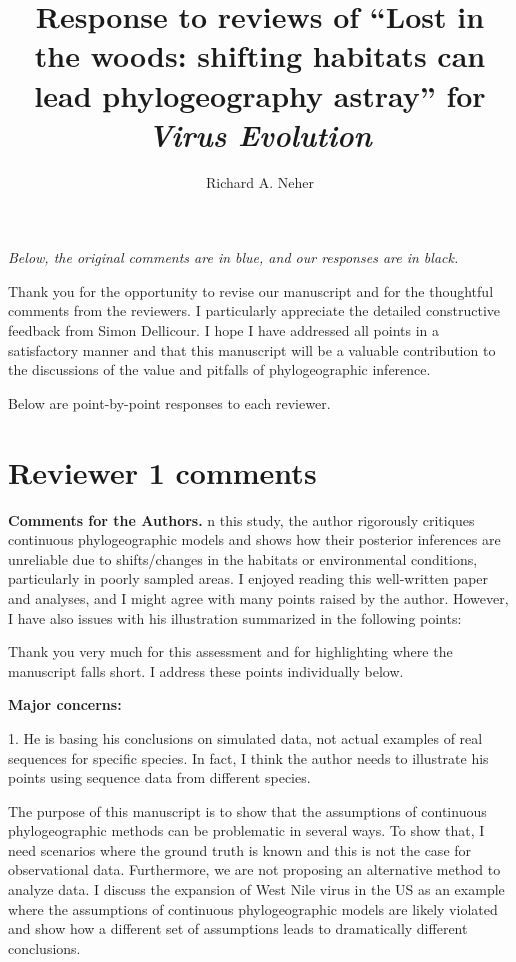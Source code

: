\documentclass[11pt, oneside]{article}   	%
\title{Response to reviews of ``Lost in the woods: shifting habitats can lead phylogeography astray'' for \textit{Virus Evolution}}
\author{
Richard A. Neher
}
\newcommand{\response}[1]{{\color{black}{\bf Response:} #1}}
\begin{document}
\maketitle

\emph{Below, the original comments {\color{blue} are in blue}, and our responses are in black.}

\color{blue}

\response{
Thank you for the opportunity to revise our manuscript and for the thoughtful comments from the reviewers.
I particularly appreciate the detailed constructive feedback from Simon Dellicour.
I hope I have addressed all points in a satisfactory manner and that this manuscript will be a valuable contribution to the discussions of the value and pitfalls of phylogeographic inference.

Below are point-by-point responses to each reviewer.
}

\section*{Reviewer 1 comments}

{\bf Comments for the Authors.}
n this study, the author rigorously critiques continuous phylogeographic models and shows how their posterior inferences are unreliable due to shifts/changes in the habitats or environmental conditions, particularly in poorly sampled areas. I enjoyed reading this well-written paper and analyses, and I might agree with many points raised by the author. However, I have also issues with his illustration summarized in the following points:

\response{Thank you very much for this assessment and for highlighting where the manuscript falls short. I address these points individually below.}


{\bf Major concerns:}

1. He is basing his conclusions on simulated data, not actual examples of real sequences for specific species. In fact, I think the author needs to illustrate his points using sequence data from different species.

\response{The purpose of this manuscript is to show that the assumptions of continuous phylogeographic methods can be problematic in several ways. To show that, I need scenarios where the ground truth is known and this is not the case for observational data.
Furthermore, we are not proposing an alternative method to analyze data.
I discuss the expansion of West Nile virus in the US as an example where the assumptions of continuous phylogeographic models are likely violated and show how a different set of assumptions leads to dramatically different conclusions.}
\end{document}
